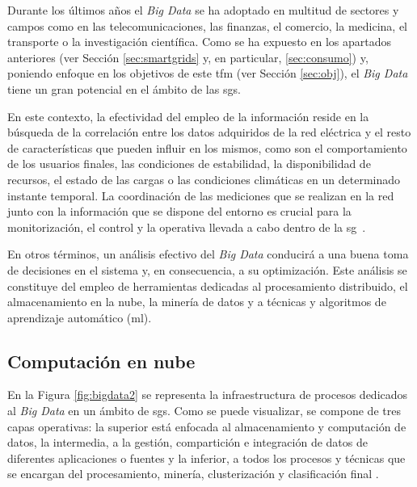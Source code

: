 \vspace{1mm}

Durante los últimos años el \textit{Big Data} se ha adoptado en multitud de sectores y campos como en las telecomunicaciones, las finanzas, el comercio, la medicina, el transporte o la investigación científica. Como se ha expuesto en los apartados anteriores (ver Sección \ref{sec:smartgrids} y, en particular, \ref{sec:consumo}) y, poniendo enfoque en los objetivos de este \gls{tfm} (ver Sección \ref{sec:obj}), el \textit{Big Data} tiene un gran potencial en el ámbito de las \gls{sg}s.

\vspace{3mm}

En este contexto, la efectividad del empleo de la información reside en la búsqueda de la correlación entre los datos adquiridos de la red eléctrica y el resto de características que pueden influir en los mismos, como son el comportamiento de los usuarios finales, las condiciones de estabilidad, la disponibilidad de recursos, el estado de las cargas o las condiciones climáticas en un determinado instante temporal. La coordinación de las mediciones que se realizan en la red junto con la información que se dispone del entorno es crucial para la monitorización, el control y la operativa llevada a cabo dentro de la \gls{sg}~\cite{stab}.

\vspace{3mm}

En otros términos, un análisis efectivo del \textit{Big Data} conducirá a una buena toma de decisiones en el sistema y, en consecuencia, a su optimización. Este análisis se constituye del empleo de herramientas dedicadas al procesamiento distribuido, el almacenamiento en la nube, la minería de datos y a técnicas y algoritmos de aprendizaje automático (\gls{ml}). 

\vspace{3mm}

\subsection{Computación en nube}

En la Figura \ref{fig:bigdata2} se representa la infraestructura de procesos dedicados al \textit{Big Data} en un ámbito de \gls{sg}s. Como se puede visualizar, se compone de tres capas operativas: la superior está enfocada al almacenamiento y computación de datos, la intermedia, a la gestión, compartición e integración de datos de diferentes aplicaciones o fuentes y la inferior, a todos los procesos y técnicas que se encargan del procesamiento, minería, clusterización y clasificación final \cite{stab}.

